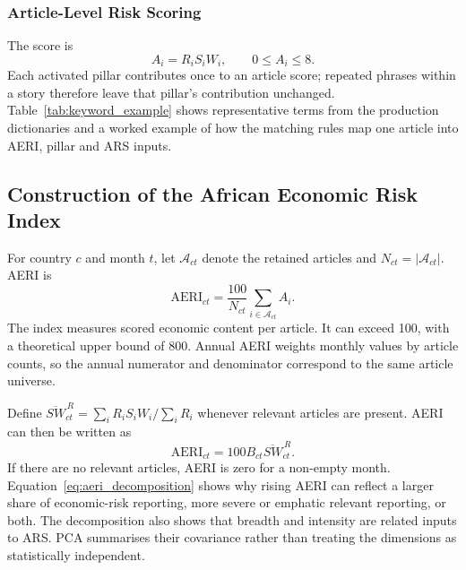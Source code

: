 \documentclass[12pt]{article}
\begin{document}
\subsubsection{Article-Level Risk Scoring}\label{sec:article_scoring}
The score is
\begin{equation} A_i=R_iS_iW_i,\qquad 0\leq A_i\leq8.\label{eq:article}\end{equation}
Each activated pillar contributes once to an article score; repeated phrases within a story therefore leave that pillar's contribution unchanged. Table~\ref{tab:keyword_example} shows representative terms from the production dictionaries and a worked example of how the matching rules map one article into AERI, pillar and ARS inputs.

\subsection{Construction of the African Economic Risk Index}\label{sec:aeri}
For country $c$ and month $t$, let $\mathcal A_{ct}$ denote the retained articles and $N_{ct}=|\mathcal A_{ct}|$. AERI is
\begin{equation}\mathrm{AERI}_{ct}=\frac{100}{N_{ct}}\sum_{i\in\mathcal A_{ct}}A_i.\label{eq:aeri}\end{equation}
The index measures scored economic content per article. It can exceed 100, with a theoretical upper bound of 800. Annual AERI weights monthly values by article counts, so the annual numerator and denominator correspond to the same article universe.

Define $\overline{SW}_{ct}^{\,R}=\sum_iR_iS_iW_i/\sum_iR_i$ whenever relevant articles are present. AERI can then be written as
\begin{equation}
 \mathrm{AERI}_{ct}=100B_{ct}\overline{SW}_{ct}^{\,R}.\label{eq:aeri_decomposition}
\end{equation}
If there are no relevant articles, AERI is zero for a non-empty month. Equation~\eqref{eq:aeri_decomposition} shows why rising AERI can reflect a larger share of economic-risk reporting, more severe or emphatic relevant reporting, or both. The decomposition also shows that breadth and intensity are related inputs to ARS. PCA summarises their covariance rather than treating the dimensions as statistically independent.
\end{document}
